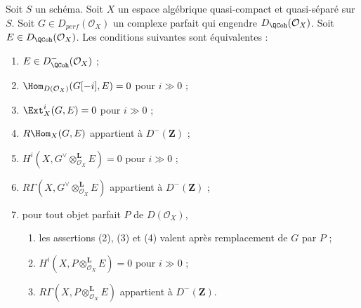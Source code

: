 \begin{proposition}
\label{proposition-detecting-bounded-above}
Soit $S$ un sch\'ema.
Soit $X$ un espace alg\'ebrique quasi-compact et quasi-s\'epar\'e sur $S$.
Soit $G\in D_{perf}(\mathcal{O}_X)$ un complexe parfait qui engendre
$D_\QCoh(\mathcal{O}_X)$. Soit $E\in D_\QCoh(\mathcal{O}_X)$.
Les conditions suivantes sont \'equivalentes :
\begin{enumerate}
\item $E\in D^-_\QCoh(\mathcal{O}_X)$ ;
\item $\Hom_{D(\mathcal{O}_X)}(G[-i],E)=0$ pour $i\gg0$ ;
\item $\Ext^i_X(G,E)=0$ pour $i\gg0$ ;
\item $R\Hom_X(G,E)$ appartient \`a $D^-(\mathbf{Z})$ ;
\item $H^i(X,G^\vee\otimes_{\mathcal{O}_X}^\mathbf{L}E)=0$ pour $i\gg0$ ;
\item $R\Gamma(X,G^\vee\otimes_{\mathcal{O}_X}^\mathbf{L}E)$ appartient \`a
$D^-(\mathbf{Z})$ ;
\item pour tout objet parfait $P$ de $D(\mathcal{O}_X)$,
\begin{enumerate}
\item les assertions (2), (3) et (4) valent apr\`es remplacement de $G$ par
$P$ ;
\item $H^i(X,P\otimes_{\mathcal{O}_X}^\mathbf{L}E)=0$ pour $i\gg0$ ;
\item $R\Gamma(X,P\otimes_{\mathcal{O}_X}^\mathbf{L}E)$ appartient \`a
$D^-(\mathbf{Z})$.
\end{enumerate}
\end{enumerate}
\end{proposition}


